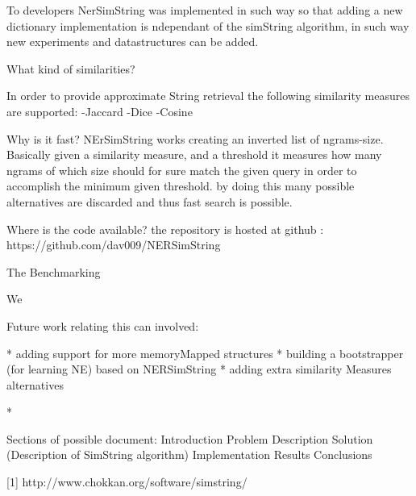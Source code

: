 To developers NerSimString was implemented in such way so that adding a new dictionary implementation is ndependant of the simString algorithm, in such way new experiments and datastructures can be added.

What kind of similarities?

In order to provide approximate String retrieval the following similarity measures are supported:
-Jaccard
-Dice
-Cosine


Why is it fast?
NErSimString works creating an inverted list of ngrams-size.
Basically given a similarity measure, and a threshold it measures how many ngrams of which size should for sure match the given query in order
to accomplish the minimum given threshold. by doing this many possible alternatives are discarded and thus fast search is possible.

Where is the code available?
the repository is hosted at github : https://github.com/dav009/NERSimString



The Benchmarking 

We 

Future work relating this can involved:

* adding support for more memoryMapped structures
* building a bootstrapper (for learning NE) based on NERSimString
* adding extra similarity Measures alternatives

*

Sections of possible document:
	Introduction
	Problem Description
	Solution (Description of SimString algorithm)
	Implementation
	Results
	Conclusions

 






[1] http://www.chokkan.org/software/simstring/
